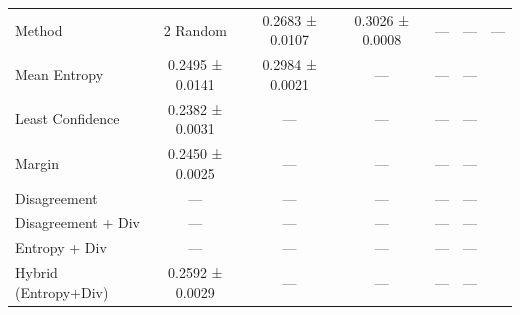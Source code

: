 \begin{tabular}{lccccc}
\toprule
Method & 2%
\midrule
Random & 0.2683 ± 0.0107 & 0.3026 ± 0.0008 & — & — & — \\
Mean Entropy & 0.2495 ± 0.0141 & 0.2984 ± 0.0021 & — & — & — \\
Least Confidence & 0.2382 ± 0.0031 & — & — & — & — \\
Margin & 0.2450 ± 0.0025 & — & — & — & — \\
Disagreement & — & — & — & — & — \\
Disagreement + Div & — & — & — & — & — \\
Entropy + Div & — & — & — & — & — \\
Hybrid (Entropy+Div) & 0.2592 ± 0.0029 & — & — & — & — \\
\bottomrule
\end{tabular}
